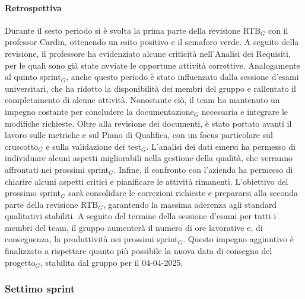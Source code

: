 \documentclass[10pt]{article}
\begin{document}
{{{{{{{    \paragraph{Retrospettiva}\mbox{}\vspace{0.4em}

    Durante il sesto periodo si è svolta la prima parte della revisione RTB$_G$ con il professor Cardin, ottenendo un esito positivo e il semaforo verde. A seguito della revisione, il professore ha evidenziato alcune criticità nell’Analisi dei Requisiti, per le quali sono già state avviate le opportune attività correttive.
    Analogamente al quinto sprint$_G$, anche questo periodo è stato influenzato dalla sessione d’esami universitari, che ha ridotto la disponibilità dei membri del gruppo e rallentato il completamento di alcune attività. Nonostante ciò, il team ha mantenuto un impegno costante per concludere la documentazione$_G$ necessaria e integrare le modifiche richieste.
    Oltre alla revisione dei documenti, è stato portato avanti il lavoro sulle metriche e sul Piano di Qualifica, con un focus particolare sul cruscotto$_G$ e sulla validazione dei test$_G$. L’analisi dei dati emersi ha permesso di individuare alcuni aspetti migliorabili nella gestione della qualità, che verranno affrontati nei prossimi sprint$_G$.
    Infine, il confronto con l’azienda ha permesso di chiarire alcuni aspetti critici e pianificare le attività rimanenti. L’obiettivo del prossimo sprint$_G$ sarà consolidare le correzioni richieste e prepararsi alla seconda parte della revisione RTB$_G$, garantendo la massima aderenza agli standard qualitativi stabiliti.
    A seguito del termine della sessione d'esami per tutti i membri del team, il gruppo aumenterà il numero di ore lavorative e, di conseguenza, la produttività nei prossimi sprint$_G$. Questo impegno aggiuntivo è finalizzato a rispettare quanto più possibile la nuova data di consegna del progetto$_G$, stabilita dal gruppo per il 04-04-2025.
    

    \newpage
    \subsubsection{Settimo sprint}
    \label{settimo-sprint$_G$}
        
}}}}}}}
\end{document}
